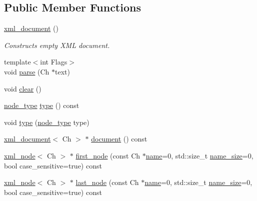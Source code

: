 \subsection*{Public Member Functions}
\begin{DoxyCompactItemize}
\item 
\hyperlink{classrapidxml_1_1xml__document_aae8841b15085ba8f32ff46587ace28f5}{xml\+\_\+document} ()
\begin{DoxyCompactList}\small\item\em Constructs empty X\+M\+L document. \end{DoxyCompactList}\item 
{\footnotesize template$<$int Flags$>$ }\\void \hyperlink{classrapidxml_1_1xml__document_ac6e73ff9ac323bf5a370c38feb03a6b1}{parse} (Ch $\ast$text)
\item 
void \hyperlink{classrapidxml_1_1xml__document_a826929ff54242532198701f19ff5f83f}{clear} ()
\item 
\hyperlink{namespacerapidxml_abb456db38f7efb746c4330eed6072a7c}{node\+\_\+type} \hyperlink{classrapidxml_1_1xml__node_a2c6a4315b98bcfa2e04fed3fa1b22c36}{type} () const 
\item 
void \hyperlink{classrapidxml_1_1xml__node_a499bbc9300c1b06821d5c08b24164c68}{type} (\hyperlink{namespacerapidxml_abb456db38f7efb746c4330eed6072a7c}{node\+\_\+type} type)
\item 
\hyperlink{classrapidxml_1_1xml__document}{xml\+\_\+document}$<$ Ch $>$ $\ast$ \hyperlink{classrapidxml_1_1xml__node_adb6ad21a4590cf13d4a6a5036e3cdbbc}{document} () const 
\item 
\hyperlink{classrapidxml_1_1xml__node}{xml\+\_\+node}$<$ Ch $>$ $\ast$ \hyperlink{classrapidxml_1_1xml__node_a2dedeb4e04bb35e06a9a7bddf6ba652d}{first\+\_\+node} (const Ch $\ast$\hyperlink{classrapidxml_1_1xml__base_a9a09739310469995db078ebd0da3ed45}{name}=0, std\+::size\+\_\+t \hyperlink{classrapidxml_1_1xml__base_a7e7f98b3d01e1eab8dc1ca69aad9af84}{name\+\_\+size}=0, bool case\+\_\+sensitive=true) const 
\item 
\hyperlink{classrapidxml_1_1xml__node}{xml\+\_\+node}$<$ Ch $>$ $\ast$ \hyperlink{classrapidxml_1_1xml__node_a2ace550c18cf10da6303773972d7157f}{last\+\_\+node} (const Ch $\ast$\hyperlink{classrapidxml_1_1xml__base_a9a09739310469995db078ebd0da3ed45}{name}=0, std\+::size\+\_\+t \hyperlink{classrapidxml_1_1xml__base_a7e7f98b3d01e1eab8dc1ca69aad9af84}{name\+\_\+size}=0, bool case\+\_\+sensitive=true) const 
\item 

\end{DoxyCompactItemize}
